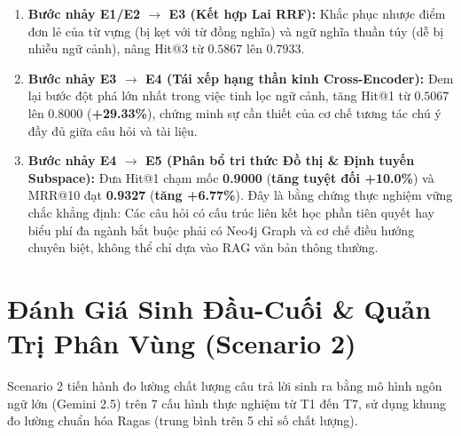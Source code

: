 \documentclass[a4paper,10pt]{article}
\begin{document}
\begin{successbox}
\begin{enumerate}[leftmargin=1.5em,itemsep=2pt]
    \item \textbf{Bước nhảy E1/E2 $\to$ E3 (Kết hợp Lai RRF):} Khắc phục nhược điểm đơn lẻ của từ vựng (bị kẹt với từ đồng nghĩa) và ngữ nghĩa thuần túy (dễ bị nhiễu ngữ cảnh), nâng Hit@3 từ $0.5867$ lên $0.7933$.
    \item \textbf{Bước nhảy E3 $\to$ E4 (Tái xếp hạng thần kinh Cross-Encoder):} Đem lại bước đột phá lớn nhất trong việc tinh lọc ngữ cảnh, tăng Hit@1 từ $0.5067$ lên $0.8000$ (\textbf{+29.33\%}), chứng minh sự cần thiết của cơ chế tương tác chú ý đầy đủ giữa câu hỏi và tài liệu.
    \item \textbf{Bước nhảy E4 $\to$ E5 (Phân bổ tri thức Đồ thị \& Định tuyến Subspace):} Đưa Hit@1 chạm mốc \textbf{0.9000} (\textbf{tăng tuyệt đối +10.0\%}) và MRR@10 đạt \textbf{0.9327} (\textbf{tăng +6.77\%}). Đây là bằng chứng thực nghiệm vững chắc khẳng định: Các câu hỏi có cấu trúc liên kết học phần tiên quyết hay biểu phí đa ngành bắt buộc phải có Neo4j Graph và cơ chế điều hướng chuyên biệt, không thể chỉ dựa vào RAG văn bản thông thường.
\end{enumerate}
\end{successbox}

\section{Đánh Giá Sinh Đầu-Cuối \& Quản Trị Phân Vùng (Scenario 2)}

Scenario 2 tiến hành đo lường chất lượng câu trả lời sinh ra bằng mô hình ngôn ngữ lớn (Gemini 2.5) trên 7 cấu hình thực nghiệm từ T1 đến T7, sử dụng khung đo lường chuẩn hóa Ragas (trung bình trên 5 chỉ số chất lượng).
\end{document}
